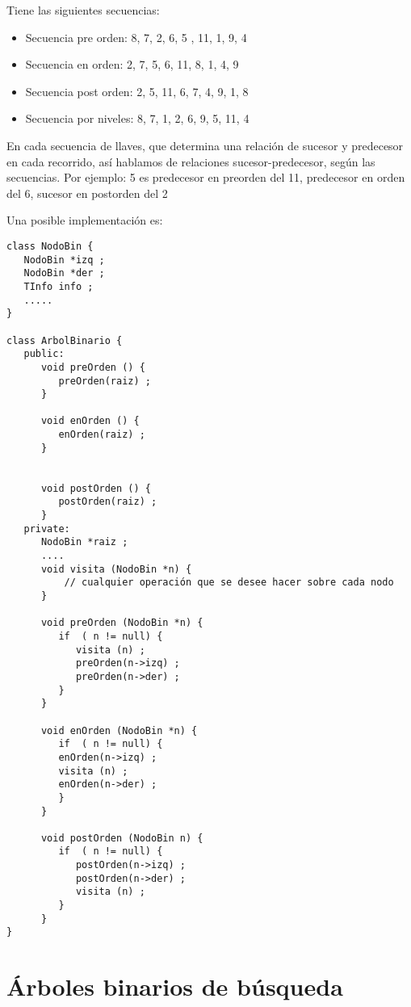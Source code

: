 Tiene las siguientes secuencias:


\begin{itemize}
\item Secuencia pre orden: 8, 7, 2, 6, 5 , 11, 1, 9, 4
\item Secuencia en orden: 2, 7, 5, 6, 11, 8, 1, 4, 9
\item Secuencia post orden: 2, 5, 11, 6, 7, 4, 9, 1, 8
\item Secuencia por niveles: 8, 7, 1, 2, 6, 9, 5, 11, 4
\end{itemize}

En cada secuencia de llaves, que determina una relación de sucesor y
predecesor en cada recorrido, así hablamos de relaciones
sucesor-predecesor, según las secuencias.  Por ejemplo: 5 es
predecesor en preorden del 11, predecesor en orden del 6, sucesor en
postorden del 2

Una posible implementación es:

\begin{verbatim}
class NodoBin {
   NodoBin *izq ;
   NodoBin *der ;
   TInfo info ;
   .....
}

class ArbolBinario {
   public:
      void preOrden () {
         preOrden(raiz) ;
      }

      void enOrden () {
         enOrden(raiz) ;
      }


      void postOrden () {
         postOrden(raiz) ;
      }
   private:
      NodoBin *raiz ;
      ....
      void visita (NodoBin *n) {
          // cualquier operación que se desee hacer sobre cada nodo
      }

      void preOrden (NodoBin *n) {
         if  ( n != null) {
            visita (n) ;
            preOrden(n->izq) ;
            preOrden(n->der) ;
         }
      }

      void enOrden (NodoBin *n) {
         if  ( n != null) {
         enOrden(n->izq) ;
         visita (n) ;
         enOrden(n->der) ;
         }
      }

      void postOrden (NodoBin n) {
         if  ( n != null) {
            postOrden(n->izq) ;
            postOrden(n->der) ;
            visita (n) ;
         }
      }
} 
\end{verbatim}

\section{Árboles binarios de búsqueda}
\label{sec:arboles-binarios-de}

